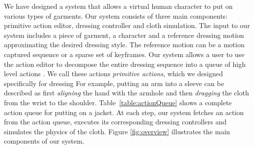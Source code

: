 We have designed a system that allows a virtual human character to put
on various types of garments. Our system consists of three main
components: primitive action editor, dressing controller and cloth
simulation. The input to our system includes a piece of garment, a
character and a reference dressing motion approximating the desired
dressing style. The reference motion can be a motion captured sequence
or a sparse set of keyframes. Our system allows a user to use the
action editor to decompose the entire dressing sequence into a queue
of high level actions . We call these actions \emph{primitive actions}, which we
designed specifically for dressing  For example, putting an arm into a sleeve can be described as first \emph{aligning} the hand with the armhole and then \emph{dragging} the cloth from the wrist to the shoulder. Table~\ref{table:actionQueue} shows a complete action queue for putting on a jacket. At each step, our system fetches an action from the action queue, executes its corresponding dressing controllers and simulates the physics of the cloth. Figure \ref{fig:overview} illustrates the main components of our system. 



